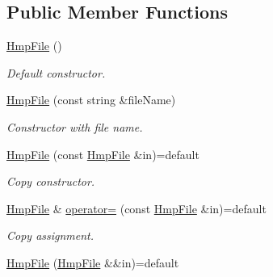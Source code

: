 \subsection*{Public Member Functions}
\begin{DoxyCompactItemize}
\item 
\mbox{\label{classsamp_files_1_1_hmp_file_a12005328f7ce0f31615cb4765602ce4e}} 
\hyperlink{classsamp_files_1_1_hmp_file_a12005328f7ce0f31615cb4765602ce4e}{Hmp\+File} ()
\begin{DoxyCompactList}\small\item\em Default constructor. \end{DoxyCompactList}\item 
\hyperlink{classsamp_files_1_1_hmp_file_a69e670927eea527587417d28e05734cd}{Hmp\+File} (const string \&file\+Name)
\begin{DoxyCompactList}\small\item\em Constructor with file name. \end{DoxyCompactList}\item 
\mbox{\label{classsamp_files_1_1_hmp_file_a1b4d1f28f04e5dbd2a6f81008171b9c0}} 
\hyperlink{classsamp_files_1_1_hmp_file_a1b4d1f28f04e5dbd2a6f81008171b9c0}{Hmp\+File} (const \hyperlink{classsamp_files_1_1_hmp_file}{Hmp\+File} \&in)=default
\begin{DoxyCompactList}\small\item\em Copy constructor. \end{DoxyCompactList}\item 
\mbox{\label{classsamp_files_1_1_hmp_file_a338d25389296d566b2efd06335ee61fe}} 
\hyperlink{classsamp_files_1_1_hmp_file}{Hmp\+File} \& \hyperlink{classsamp_files_1_1_hmp_file_a338d25389296d566b2efd06335ee61fe}{operator=} (const \hyperlink{classsamp_files_1_1_hmp_file}{Hmp\+File} \&in)=default
\begin{DoxyCompactList}\small\item\em Copy assignment. \end{DoxyCompactList}\item 
\mbox{\label{classsamp_files_1_1_hmp_file_a1344bb70d7a2db7cb44eb1cc0e5d565e}} 
\hyperlink{classsamp_files_1_1_hmp_file_a1344bb70d7a2db7cb44eb1cc0e5d565e}{Hmp\+File} (\hyperlink{classsamp_files_1_1_hmp_file}{Hmp\+File} \&\&in)=default

\end{DoxyCompactItemize}
